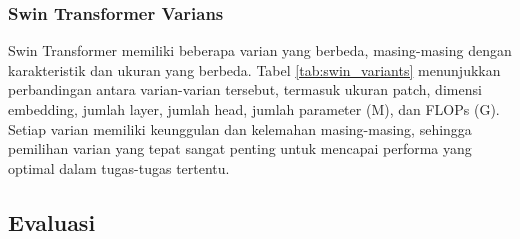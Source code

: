 \subsubsection{Swin Transformer Varians}
Swin Transformer memiliki beberapa varian yang berbeda, masing-masing dengan karakteristik dan ukuran yang berbeda. Tabel \ref{tab:swin_variants} menunjukkan perbandingan antara varian-varian tersebut, termasuk ukuran patch, dimensi embedding, jumlah layer, jumlah head, jumlah parameter (M), dan FLOPs (G). Setiap varian memiliki keunggulan dan kelemahan masing-masing, sehingga pemilihan varian yang tepat sangat penting untuk mencapai performa yang optimal dalam tugas-tugas tertentu.
\begin{table}[H]
    \centering
    \caption{Varian Swin Transformer dan Karakteristiknya}\label{tab:swin_variants}
    \end{table}
    


\subsection{Evaluasi}